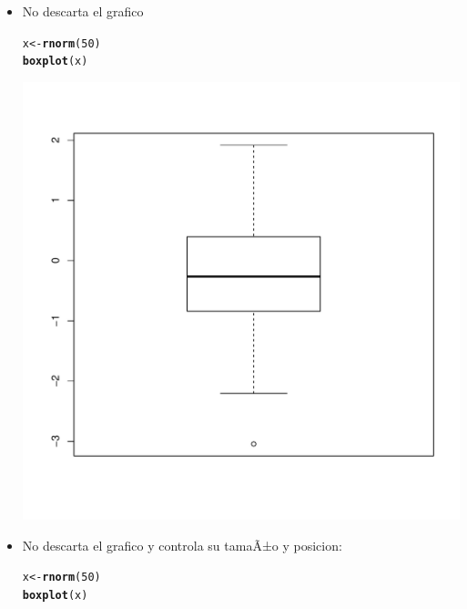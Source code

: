 \documentclass[12pt,a4paper]{article}\usepackage[]{graphicx}\usepackage[]{color}
\makeatletter
\def\maxwidth{ %
  \ifdim\Gin@nat@width>\linewidth
    \linewidth
  \else
    \Gin@nat@width
  \fi
}
\newcommand{\hlnum}[1]{\textcolor[rgb]{0.686,0.059,0.569}{#1}}%
\newcommand{\hlstd}[1]{\textcolor[rgb]{0.345,0.345,0.345}{#1}}%
\newcommand{\hlkwb}[1]{\textcolor[rgb]{0.69,0.353,0.396}{#1}}%
\newcommand{\hlkwd}[1]{\textcolor[rgb]{0.737,0.353,0.396}{\textbf{#1}}}%
\newenvironment{kframe}{%
 \def\at@end@of@kframe{}%
 \ifinner\ifhmode%
  \def\at@end@of@kframe{\end{minipage}}%
  \begin{minipage}{\columnwidth}%
 \fi\fi%
 \def\FrameCommand##1{\hskip\@totalleftmargin \hskip-\fboxsep
 \colorbox{shadecolor}{##1}\hskip-\fboxsep
     \hskip-\linewidth \hskip-\@totalleftmargin \hskip\columnwidth}%
 \MakeFramed {\advance\hsize-\width
   \@totalleftmargin\z@ \linewidth\hsize
   \@setminipage}}%
 {\par\unskip\endMakeFramed%
 \at@end@of@kframe}
\newenvironment{knitrout}{}{} %
\makeatother
\begin{document}
\begin{itemize}
\item No descarta el grafico

\begin{knitrout}
\color{fgcolor}\begin{kframe}
\begin{alltt}
\hlstd{x} \hlkwb{<-} \hlkwd{rnorm}\hlstd{(}\hlnum{50}\hlstd{)}
\hlkwd{boxplot}\hlstd{(x)}
\end{alltt}
\end{kframe}
\includegraphics[width=\maxwidth]{figure/unnamed-chunk-6-1} 

\end{knitrout}

\item No descarta el grafico y controla su tamaÃ±o y posicion:

\begin{knitrout}
\color{fgcolor}\begin{kframe}
\begin{alltt}
\hlstd{x} \hlkwb{<-} \hlkwd{rnorm}\hlstd{(}\hlnum{50}\hlstd{)}
\hlkwd{boxplot}\hlstd{(x)}
\end{alltt}
\end{kframe}


\end{knitrout}
\end{itemize}
\end{document}
